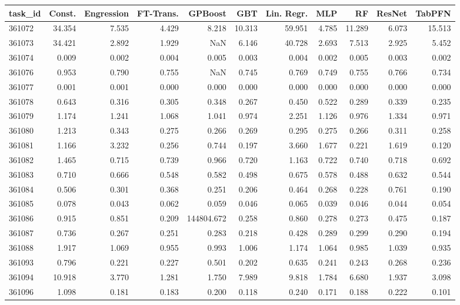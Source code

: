 \begin{tabular}{lrrrrrrrrrr}
\toprule
task\_id & Const. & Engression & FT-Trans. & GPBoost & GBT & Lin. Regr. & MLP & RF & ResNet & TabPFN \\
\midrule
361072 & 34.354 & 7.535 & 4.429 & 8.218 & 10.313 & 59.951 & 4.785 & 11.289 & 6.073 & 15.513 \\
361073 & 34.421 & 2.892 & 1.929 & NaN & 6.146 & 40.728 & 2.693 & 7.513 & 2.925 & 5.452 \\
361074 & 0.009 & 0.002 & 0.004 & 0.005 & 0.003 & 0.004 & 0.002 & 0.005 & 0.003 & 0.002 \\
361076 & 0.953 & 0.790 & 0.755 & NaN & 0.745 & 0.769 & 0.749 & 0.755 & 0.766 & 0.734 \\
361077 & 0.001 & 0.001 & 0.000 & 0.000 & 0.000 & 0.000 & 0.000 & 0.000 & 0.000 & 0.000 \\
361078 & 0.643 & 0.316 & 0.305 & 0.348 & 0.267 & 0.450 & 0.522 & 0.289 & 0.339 & 0.235 \\
361079 & 1.174 & 1.241 & 1.068 & 1.041 & 0.974 & 2.251 & 1.126 & 0.976 & 1.334 & 0.971 \\
361080 & 1.213 & 0.343 & 0.275 & 0.266 & 0.269 & 0.295 & 0.275 & 0.266 & 0.311 & 0.258 \\
361081 & 1.166 & 3.232 & 0.256 & 0.744 & 0.197 & 3.660 & 1.677 & 0.221 & 1.619 & 0.120 \\
361082 & 1.465 & 0.715 & 0.739 & 0.966 & 0.720 & 1.163 & 0.722 & 0.740 & 0.718 & 0.692 \\
361083 & 0.710 & 0.666 & 0.548 & 0.582 & 0.498 & 0.675 & 0.578 & 0.488 & 0.632 & 0.544 \\
361084 & 0.506 & 0.301 & 0.368 & 0.251 & 0.206 & 0.464 & 0.268 & 0.228 & 0.761 & 0.190 \\
361085 & 0.078 & 0.043 & 0.062 & 0.059 & 0.046 & 0.065 & 0.039 & 0.046 & 0.044 & 0.054 \\
361086 & 0.915 & 0.851 & 0.209 & 144804.672 & 0.258 & 0.860 & 0.278 & 0.273 & 0.475 & 0.187 \\
361087 & 0.736 & 0.267 & 0.251 & 0.283 & 0.218 & 0.428 & 0.289 & 0.299 & 0.290 & 0.194 \\
361088 & 1.917 & 1.069 & 0.955 & 0.993 & 1.006 & 1.174 & 1.064 & 0.985 & 1.039 & 0.935 \\
361093 & 0.796 & 0.221 & 0.227 & 0.501 & 0.202 & 0.635 & 0.241 & 0.243 & 0.268 & 0.236 \\
361094 & 10.918 & 3.770 & 1.281 & 1.750 & 7.989 & 9.818 & 1.784 & 6.680 & 1.937 & 3.098 \\
361096 & 1.098 & 0.181 & 0.183 & 0.200 & 0.118 & 0.240 & 0.171 & 0.188 & 0.222 & 0.101 \\

\end{tabular}
